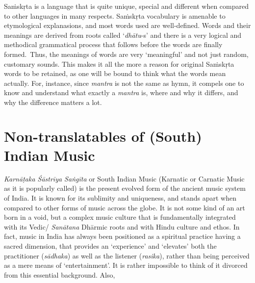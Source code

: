 \newpage

Saṁskṛta is a language that is quite unique, special and different when compared to other languages in many respects. Saṁskṛta vocabulary is amenable to etymological explanasions, and most words used are well-defined. Words and their meanings are derived from roots called ‘\textit{dhātu}-s’ and there is a very logical and methodical grammatical process that follows before the words are finally formed.~Thus, the meanings of words are very ‘meaningful’ and not just random, customary sounds. This makes it all the more a reason for original Saṁskṛta words to be retained, as one will be bound to think what the words mean actually. For, instance, since \textit{mantra} is not the same as hymn, it compels one to know and understand what exactly a \textit{mantra} is, where and why it differs, and why the difference matters a lot.

\vspace{-.3cm}

\section*{Non-translatables of (South) Indian Music}

\textit{Karnāṭaka Śāstrīya Saṅgīta} or South Indian Music (Karnatic or Carnatic Music as it is popularly called) is the present evolved form of the ancient music system of India. It is known for its sublimity and uniqueness, and stands apart when compared to other forms of music across the globe. It is not some kind of an art born in a void, but a complex music culture that is fundamentally integrated with its Vedic/ \textit{Sanātana} Dhārmic roots and with Hindu culture and ethos. In fact, music in India has always been positioned as a spiritual practice having a sacred dimension, that provides an ‘experience’ and ‘elevates’ both the practitioner (\textit{sādhaka}) as well as the listener (\textit{rasika}), rather than being perceived as a mere means of ‘entertainment’. It is rather impossible to think of it divorced from this essential background. Also,

